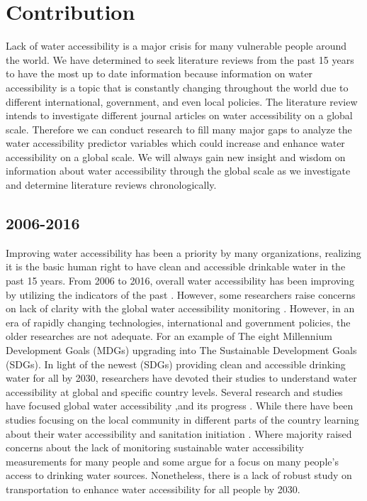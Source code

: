 \documentclass[10pt,twoside]{article}
\numberwithin{equation}{section}
\newcommand{\?}{\stackrel{?}{=}}
\begin{document}
\section{Contribution}
Lack of water accessibility is a major crisis for many vulnerable people around the world. We have determined to seek literature reviews from the past 15 years to have the most up to date information because information on water accessibility is a topic that is constantly changing throughout the world due to different international, government, and even local policies. The literature review intends to investigate different journal articles on water accessibility on a global scale. Therefore we can conduct research to fill many major gaps to analyze the water accessibility predictor variables which could increase and enhance water accessibility on a global scale. We will always gain new insight and wisdom on information about water accessibility through the global scale as we investigate and determine literature reviews chronologically. 
\subsection{2006-2016}
Improving water accessibility has been a priority by many organizations, realizing it is the basic human right to have clean and accessible drinkable water in the past 15 years. From 2006 to 2016, overall water accessibility has been improving by utilizing the indicators of the past \citep{fuller2016tracking}. However, some researchers raise concerns on lack of clarity with the global water accessibility monitoring \citep{onda2012global, jia2016highresolution}. However, in an era of rapidly changing technologies, international and government policies, the older researches are not adequate. For an example of The eight Millennium Development Goals (MDGs) upgrading into The Sustainable Development Goals (SDGs). In light of the newest (SDGs) providing clean and accessible drinking water for all by 2030, researchers have devoted their studies to understand water accessibility at global and specific country levels. Several research and studies have focused global water accessibility ,and its progress \citep{sorensonSafeAccessSafe2011,bainAccountingWaterQuality2012,wssccWaterSanitationHygiene2014,  onda2012global, bartram2014global, onda2014country, who2015drinkingwater,fuller2016tracking, weiyuyuGlobalPerspectiveDrinkingwater2016, grahamAnalysisWaterCollection2016,overboOnplotDrinkingWater2016}. While there have been studies focusing on the local community in different parts of the country learning about their water accessibility and sanitation initiation \citep{jagals2006does, geereDomesticWaterCarrying2010, sima2013water, ho2014challenge, sakisakaIntroductionCommunityWater2015, jia2016highresolution}. Where majority raised concerns about the lack of monitoring sustainable water accessibility measurements for many people and some argue for a focus on many people's access to drinking water sources. Nonetheless, there is a lack of robust study on transportation to enhance water accessibility for all people by 2030. 
\end{document}
